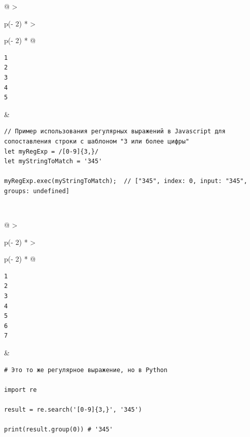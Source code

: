 \documentclass{article}
\begin{document}
\begin{longtable}[]{@{}
  >{\raggedright\arraybackslash}p{(\columnwidth - 2\tabcolsep) * }
  >{\raggedright\arraybackslash}p{(\columnwidth - 2\tabcolsep) * }@{}}
\toprule
\endhead
\begin{minipage}[t]{\linewidth}\raggedright
\begin{verbatim}
1
2
3
4
5
\end{verbatim}
\end{minipage} & \begin{minipage}[t]{\linewidth}\raggedright
\begin{verbatim}
// Пример использования регулярных выражений в Javascript для сопоставления строки с шаблоном "3 или более цифры"
let myRegExp = /[0-9]{3,}/
let myStringToMatch = '345'

myRegExp.exec(myStringToMatch);  // ["345", index: 0, input: "345", groups: undefined]
\end{verbatim}
\end{minipage} \\ \addlinespace
\bottomrule
\end{longtable}

\begin{longtable}[]{@{}
  >{\raggedright\arraybackslash}p{(\columnwidth - 2\tabcolsep) * }
  >{\raggedright\arraybackslash}p{(\columnwidth - 2\tabcolsep) * }@{}}
\toprule
\endhead
\begin{minipage}[t]{\linewidth}\raggedright
\begin{verbatim}
1
2
3
4
5
6
7
\end{verbatim}
\end{minipage} & \begin{minipage}[t]{\linewidth}\raggedright
\begin{verbatim}
# Это то же регулярное выражение, но в Python

import re

result = re.search('[0-9]{3,}', '345')

print(result.group(0)) # '345'
\end{verbatim}
\end{minipage} \\ \addlinespace
\bottomrule
\end{longtable}
\end{document}
